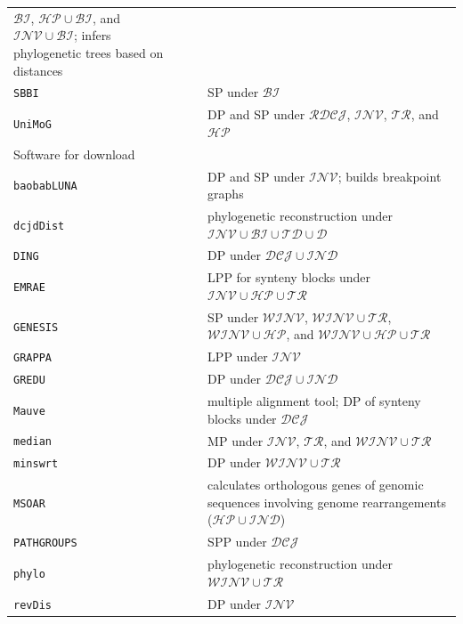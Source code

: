 \documentclass{svmult}
\newcommand{\m}[1]{\mathcal{#1}}
\begin{document}
\begin{table}
\begin{center}
\begin{threeparttable}
\begin{tabular}{l l p{7.2cm}}
    $\m{BI}$, $\m{HP}\cup\m{BI}$, and $\m{INV}\cup\m{BI}$; infers
    phylogenetic trees based on distances \\
    \texttt{SBBI}\tnote{a} & \cite{Christie_1996,SBBI} & SP under $\m{BI}$\\
    \texttt{UniMoG}\tnote{a} & \cite{UniMoG} & DP and SP under
    $\m{RDCJ}$, $\m{INV}$, $\m{TR}$, and $\m{HP}$     \vspace{0.2cm}\\
    Software for download & & \\
    \hline
    \texttt{baobabLUNA} & \cite{baobabLUNA,Braga_2009b}& DP and SP under $\m{INV}$; builds breakpoint
    graphs\\
    \texttt{dcjdDist} & \cite{DCJDDIST,Bader_2009} &  phylogenetic
    reconstruction under $\m{INV}\cup\m{BI}\cup\m{TD}\cup\m{D}$\\
    \texttt{DING} & \cite{DING,bohnenkaemper2021naturalgenomes} & DP under $\m{DCJ}\cup\m{IND}$\\
    \texttt{EMRAE} & \cite{EMRAE,Zhao_2009} & LPP for synteny blocks
    under $\m{INV}\cup\m{HP}\cup\m{TR}$ \\
    \texttt{GENESIS} & \cite{Gog_2008,GENESIS} & SP under
   	 $\m{WINV}$, $\m{WINV}\cup\m{TR}$, $\m{WINV}\cup\m{HP}$, and
    $\m{WINV}\cup \m{HP} \cup \m{TR}$\\
    \texttt{GRAPPA} & \cite{GRAPPA,Moret_2001}& LPP under $\m{INV}$\\
    \texttt{GREDU} & \cite{GREDU,Shao_2014} & DP under
    $\m{DCJ}\cup\m{IND}$\\
    \texttt{Mauve} & \cite{Darling_2004,Mauve}& multiple alignment tool; 
    DP of synteny blocks under $\m{DCJ}$ \\
    \texttt{median} & \cite{Bader_2008,PHYLO}\tnote{b} &
    MP under $\m{INV}$, $\m{TR}$, and $\m{WINV}\cup\m{TR}$\\
    \texttt{minswrt} &
    \cite{Bader_2008,PHYLO}\tnote{b} & DP under $\m{WINV}\cup\m{TR}$\\
    \texttt{MSOAR} & \cite{Zheng_2007,MSOAR}& calculates orthologous
    genes of genomic sequences involving genome rearrangements ($\m{HP}\cup
    \m{IND}$) \\
    \texttt{PATHGROUPS} & \cite{Zheng_2011,Pathgroups} & SPP under $\m{DCJ}$\\
    \texttt{phylo} & \cite{Bader_2008,PHYLO} & phylogenetic
    reconstruction under  $\m{WINV}\cup\m{TR}$\\
    \texttt{revDis} & \cite{Bader_2008,PHYLO}\tnote{b} & DP
    under $\m{INV}$ \\

\end{tabular}
\end{threeparttable}
\end{center}
\end{table}
\end{document}
